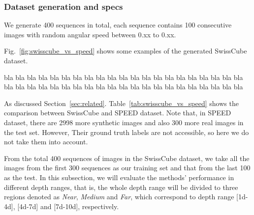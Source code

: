 \subsubsection{Dataset generation and specs}

We generate 400 sequences in total, each sequence contains 100 consecutive images with random angular speed between 0.xx to 0.xx.

Fig.~\ref{fig:swisscube_vs_speed} shows some examples of the generated SwissCube dataset.

bla bla bla bla bla bla bla bla bla bla bla bla bla bla bla bla bla bla bla bla bla bla bla bla bla bla bla bla bla bla bla bla bla bla bla bla bla bla bla bla bla bla 

As discussed Section~\ref{sec:related}. Table~\ref{tab:swisscube_vs_speed} shows the comparison between SwissCube and SPEED dataset. Note that, in SPEED dataset, there are 2998 more synthetic images and also 300 more real images in the test set. However, Their ground truth labels are not accessible, so here we do not take them into account.


From the total 400 sequences of images in the SwissCube dataset, we take all the images from the first 300 sequences as our training set and that from the last 100 as the test. In this subsection, we will evaluate the methods' performance in different depth ranges, that is, the whole depth range will be divided to three regions denoted as {\it Near}, {\it Medium} and {\it Far}, which correspond to depth range [1d-4d], [4d-7d] and [7d-10d], respectively.
